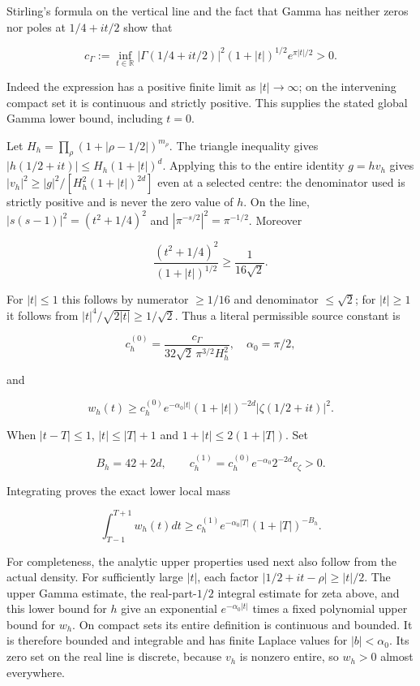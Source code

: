 Stirling's formula on the vertical line and the fact that Gamma has neither zeros nor poles at \(1/4+it/2\) show that

\[
c_\Gamma:=\inf_{t\in\mathbb R}
|\Gamma(1/4+it/2)|^2(1+|t|)^{1/2}e^{\pi|t|/2}>0.
\]

Indeed the expression has a positive finite limit as \(|t|\to\infty\); on the intervening compact set it is continuous and strictly positive. This supplies the stated global Gamma lower bound, including \(t=0\).

Let \(H_h=\prod_\rho(1+|\rho-1/2|)^{m_\rho}\). The triangle inequality gives \(|h(1/2+it)|\le H_h(1+|t|)^d\). Applying this to the entire identity \(g=hv_h\) gives \(|v_h|^2\ge |g|^2/[H_h^2(1+|t|)^{2d}]\) even at a selected centre: the denominator used is strictly positive and is never the zero value of \(h\). On the line, \(|s(s-1)|^2=(t^2+1/4)^2\) and \(|\pi^{-s/2}|^2=\pi^{-1/2}\). Moreover

\[
\frac{(t^2+1/4)^2}{(1+|t|)^{1/2}}\ge\frac1{16\sqrt2}.
\]

For \(|t|\le1\) this follows by numerator \(\ge1/16\) and denominator \(\le\sqrt2\); for \(|t|\ge1\) it follows from \(|t|^4/\sqrt{2|t|}\ge1/\sqrt2\). Thus a literal permissible source constant is

\[
c_h^{(0)}=\frac{c_\Gamma}{32\sqrt2\,\pi^{3/2}H_h^2},\quad
\alpha_0=\pi/2,
\]

and

\[
w_h(t)\ge c_h^{(0)}e^{-\alpha_0|t|}(1+|t|)^{-2d}
|\zeta(1/2+it)|^2.
\]

When \(|t-T|\le1\), \(|t|\le|T|+1\) and \(1+|t|\le2(1+|T|)\). Set

\[
B_h=42+2d,\qquad
c_h^{(1)}=c_h^{(0)}e^{-\alpha_0}2^{-2d}c_\zeta>0.
\]

Integrating proves the exact lower local mass

\[
\int_{T-1}^{T+1}w_h(t)dt\ge c_h^{(1)}e^{-\alpha_0|T|}(1+|T|)^{-B_h}.
\]

For completeness, the analytic upper properties used next also follow from the actual density. For sufficiently large \(|t|\), each factor \(|1/2+it-\rho|\ge|t|/2\). The upper Gamma estimate, the real-part-\(1/2\) integral estimate for zeta above, and this lower bound for \(h\) give an exponential \(e^{-\alpha_0|t|}\) times a fixed polynomial upper bound for \(w_h\). On compact sets its entire definition is continuous and bounded. It is therefore bounded and integrable and has finite Laplace values for \(|b|<\alpha_0\). Its zero set on the real line is discrete, because \(v_h\) is nonzero entire, so \(w_h>0\) almost everywhere.

